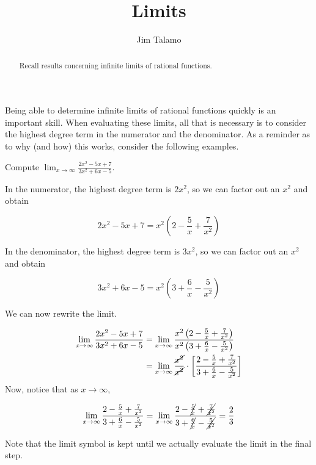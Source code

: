 \documentclass{ximera}
\author{Jim Talamo}
\title[Refresh:]{Limits}
\begin{document}
\begin{abstract}
Recall results concerning infinite limits of rational functions.
\end{abstract}
\maketitle

\begin{problem}
Being able to determine infinite limits of rational functions quickly is an important skill.  When evaluating these limits, all that is necessary is to consider the highest degree term in the numerator and the denominator.  As a reminder as to why (and how) this works, consider the following examples.

\begin{example}
Compute $\lim_{x \to \infty} \frac{2x^2-5x+7}{3x^2+6x-5}$.

\begin{explanation}
In the numerator, the highest degree term is $2x^2$, so we can factor out an $x^2$ and obtain

\[
2x^2-5x+7 = x^2\left(2-\frac{5}{x} + \frac{7}{x^2}\right)
\]

In the denominator, the highest degree term is $3x^2$, so we can factor out an $x^2$ and obtain

\[
3x^2+6x-5 = x^2\left(3+\frac{6}{x} - \frac{5}{x^2}\right)
\]

We can now rewrite the limit.

\begin{align*}
\lim_{x \to \infty} \frac{2x^2-5x+7}{3x^2+6x-5} &= \lim_{x \to \infty} \frac{x^2\left(2-\frac{5}{x} + \frac{7}{x^2}\right)}{x^2\left(3+\frac{6}{x} - \frac{5}{x^2}\right)} \\
&= \lim_{x \to \infty} \frac{\cancel{x^2}}{\cancel{x^2}} \cdot \left[ \frac{2-\frac{5}{x} + \frac{7}{x^2}}{3+\frac{6}{x} - \frac{5}{x^2}} \right] \\
\end{align*}
Now, notice that as $x \to \infty$, 

\[
 \lim_{x \to \infty}   \frac{2-\frac{5}{x} + \frac{7}{x^2}}{3+\frac{6}{x} - \frac{5}{x^2}} = \lim_{x \to \infty}   \frac{2-\cancel{\frac{5}{x}} + \cancel{\frac{7}{x^2}}}{3+\cancel{\frac{6}{x}} - \cancel{\frac{5}{x^2}}} = \frac{2}{3}\\
\]

Note that the limit symbol is kept until we actually evaluate the limit in the final step.  
\end{explanation}
\end{example}


\end{problem}
\end{document}
